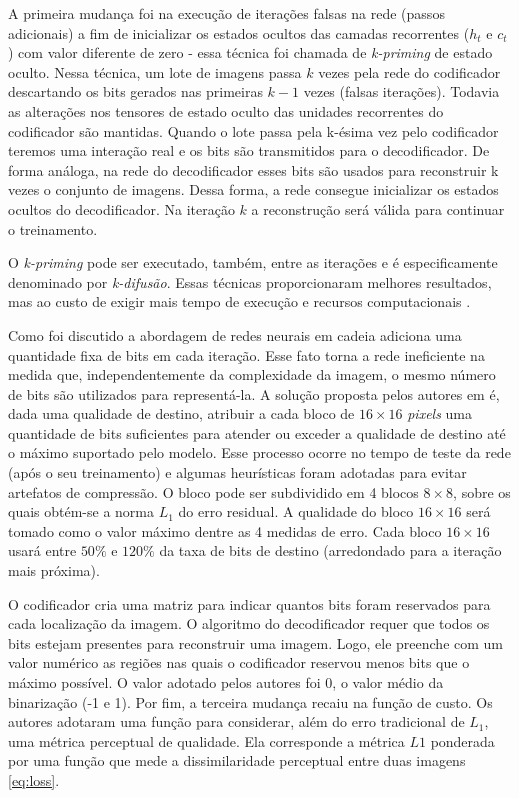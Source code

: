 A primeira mudança foi na execução de iterações falsas na rede (passos adicionais) a fim de inicializar os estados ocultos das camadas recorrentes ($h_t$ e $c_t$) com valor diferente de zero - essa técnica foi chamada de \textit{k-priming} de estado oculto.
Nessa técnica, um lote de imagens passa $k$ vezes pela rede do codificador descartando os bits gerados nas primeiras $k-1$ vezes (falsas iterações). Todavia as alterações nos tensores de estado oculto das unidades recorrentes do codificador são mantidas. Quando o lote passa pela k-ésima vez pelo codificador teremos uma interação real e os bits são transmitidos para o decodificador. 
De forma análoga, na rede do decodificador esses bits são usados para reconstruir k vezes o conjunto de imagens. Dessa forma, a rede consegue inicializar os estados ocultos do decodificador. Na iteração $k$  a reconstrução será válida para continuar o treinamento.    

O \textit{k-priming} pode ser executado, também, entre as iterações e é especificamente denominado por \textit{k-difusão}. Essas técnicas proporcionaram melhores resultados, mas ao custo de exigir mais tempo de execução e recursos computacionais \cite{Priming2017Johnston}. 


Como foi discutido a abordagem de redes neurais em cadeia adiciona uma quantidade fixa de bits em cada iteração. Esse fato torna a rede ineficiente na medida que, independentemente da complexidade da imagem, o mesmo número de bits são utilizados para representá-la.  A solução proposta pelos autores em \cite{Priming2017Johnston} é, dada uma qualidade de destino, atribuir a cada bloco de $16 \times 16$ \textit{pixels} uma quantidade de bits suficientes para atender ou exceder a qualidade de destino até o máximo suportado pelo modelo.
Esse processo ocorre no tempo de teste da rede (após o seu treinamento) e algumas  heurísticas foram adotadas para evitar artefatos de compressão. O bloco pode ser subdividido em 4 blocos  $8 \times 8$, sobre os quais obtém-se a norma $L_1$ do erro residual. A qualidade do bloco $16 \times 16$ será tomado como o valor máximo dentre as 4 medidas de erro. Cada bloco $16 \times 16$ usará entre $50\%$ e $120\%$ da taxa de bits de destino (arredondado para a iteração mais próxima). 

O codificador cria uma matriz para indicar quantos bits foram reservados para cada localização da imagem. O algoritmo do decodificador requer que todos os bits estejam presentes para reconstruir uma imagem. Logo, ele preenche com um valor numérico as regiões nas quais o codificador reservou menos bits que o máximo possível. O valor adotado pelos autores foi 0, o valor médio da binarização (-1 e 1). 
Por fim, a terceira mudança recaiu na função de custo. Os autores adotaram uma função para considerar, além do erro tradicional de $L_1$, uma métrica perceptual de qualidade. Ela corresponde a métrica $L1$ ponderada por uma função que mede a dissimilaridade perceptual entre duas imagens \ref{eq:loss}.    

